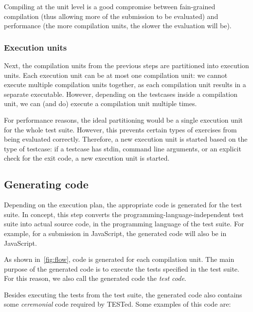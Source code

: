 \documentclass[../main]{subfiles}
\begin{document}
Compiling at the unit level is a good compromise between fain-grained compilation (thus allowing more of the submission to be evaluated) and performance (the more compilation units, the slower the evaluation will be).

\subsubsection{Execution units}

Next, the compilation units from the previous steps are partitioned into execution units.
Each execution unit can be at most one compilation unit: we cannot execute multiple compilation units together,
as each compilation unit results in a separate executable.
However, depending on the testcases inside a compilation unit, we can (and do) execute a compilation unit multiple times.

For performance reasons, the ideal partitioning would be a single execution unit for the whole test suite.
However, this prevents certain types of exercises from being evaluated correctly.
Therefore, a new execution unit is started based on the type of testcase: if a testcase has stdin, command line arguments, or an explicit check for the exit code, a new execution unit is started.

\subsection{Generating code}\label{subsec:code-generation}

Depending on the execution plan, the appropriate code is generated for the test suite.
In concept, this step converts the programming-language-independent test suite into actual source code, in the programming language of the test suite.
For example, for a submission in JavaScript, the generated code will also be in JavaScript.

As shown in~\cref{fig:flow}, code is generated for each compilation unit.
The main purpose of the generated code is to execute the tests specified in the test suite.
For this reason, we also call the generated code the \emph{test code}.

Besides executing the tests from the test suite, the generated code also contains some \emph{ceremonial} code required by TESTed.
Some examples of this code are:
\end{document}
